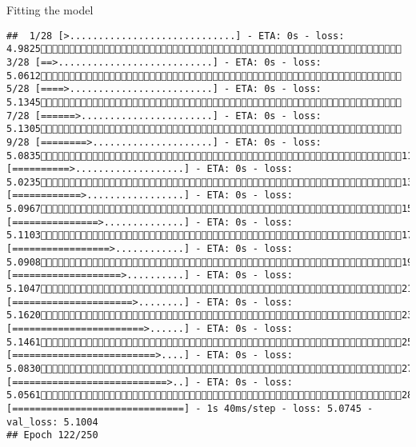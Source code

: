 \documentclass[
  ignorenonframetext,
]{beamer}
\begin{document}
\begin{frame}[fragile]{Fitting the model}
\begin{verbatim}
##  1/28 [>.............................] - ETA: 0s - loss: 4.9825 3/28 [==>...........................] - ETA: 0s - loss: 5.0612 5/28 [====>.........................] - ETA: 0s - loss: 5.1345 7/28 [======>.......................] - ETA: 0s - loss: 5.1305 9/28 [========>.....................] - ETA: 0s - loss: 5.083511/28 [==========>...................] - ETA: 0s - loss: 5.023513/28 [============>.................] - ETA: 0s - loss: 5.096715/28 [===============>..............] - ETA: 0s - loss: 5.110317/28 [=================>............] - ETA: 0s - loss: 5.090819/28 [===================>..........] - ETA: 0s - loss: 5.104721/28 [=====================>........] - ETA: 0s - loss: 5.162023/28 [=======================>......] - ETA: 0s - loss: 5.146125/28 [=========================>....] - ETA: 0s - loss: 5.083027/28 [===========================>..] - ETA: 0s - loss: 5.056128/28 [==============================] - 1s 40ms/step - loss: 5.0745 - val_loss: 5.1004
## Epoch 122/250

\end{verbatim}
\end{frame}
\end{document}
